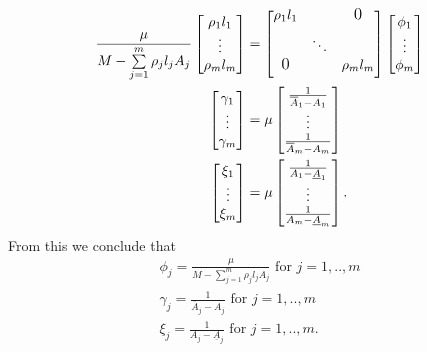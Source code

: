 \begin{align*}
\frac{\mu}{M-\sum\limits_{j=1}^m\rho_jl_jA_j}
\begin{bmatrix}
\rho_1l_1 \\
\vdots \\
\rho_ml_m\\
\end{bmatrix} &= 
\begin{bmatrix}
\rho_1l_1 & & \text{\large{0}} \\[0.5em]
 & \ddots &  \\
\text{\large{0}} & & \rho_ml_m \\[0.5em]
\end{bmatrix}
\begin{bmatrix}
\phi_1 \\
\vdots \\
\phi_m\\
\end{bmatrix}\\
\begin{bmatrix}
\gamma_1 \\
\vdots \\
\gamma_m\\
\end{bmatrix} &= \mu
\begin{bmatrix}
\frac{1}{\overline{A}_1-A_1} \\
\vdots \\
\frac{1}{\overline{A}_m-A_m}\\
\end{bmatrix}\\
\begin{bmatrix}
\xi_1 \\
\vdots \\
\xi_m\\
\end{bmatrix} 
&= \mu
\begin{bmatrix}
\frac{1}{A_1-\underline{A}_1} \\
\vdots \\
\frac{1}{A_m-\underline{A}_m}
\end{bmatrix}.
\end{align*}
From this we conclude that
\begin{align*}
\phi_j = \frac{\mu}{M-\sum\limits_{j=1}^m\rho_jl_jA_j} \text{ for } j = 1,..,m \\
\gamma_j = \frac{1}{\overline{A}_j-A_j} \text{ for } j = 1,..,m \\
\xi_j = \frac{1}{A_j-\underline{A}_j} \text{ for } j = 1,..,m.
\end{align*}